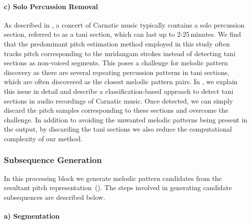

\paragraph{c) Solo Percussion Removal} 

As described in , a concert of Carnatic music typically contains a solo percussion section, referred to as a \gls{tani} section, which can last up to 2-25\,minutes. We find that the predominant pitch estimation method employed in this study often tracks pitch corresponding to the \gls{mridangam} strokes instead of detecting \gls{tani} sections as non-voiced segments. This poses a challenge for melodic pattern discovery as there are several repeating percussion patterns in \gls{tani} sections, which are often discovered as the closest melodic pattern pairs. In , we explain this issue in detail and describe a classification-based approach to detect \gls{tani} sections in audio recordings of Carnatic music. Once detected, we can simply discard the pitch samples corresponding to these sections and overcome the challenge. In addition to avoiding the unwanted melodic patterns being present in the output, by discarding the \gls{tani} sections we also reduce the computational complexity of our method.


\subsubsection{Subsequence Generation}
\label{sec:subsequencegeneration}

In this processing block we generate melodic pattern candidates from the resultant pitch representation~(). The steps involved in generating candidate subsequences are described below.

\paragraph{a) Segmentation} 

